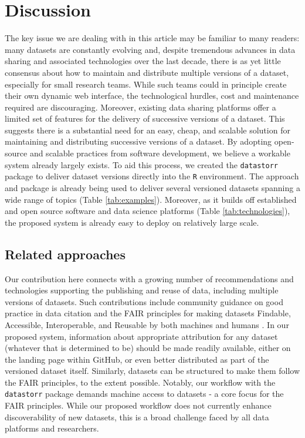 \documentclass[a4paper,num-refs]{assets/oup-contemporary}
\begin{document}
\section{Discussion}

The key issue we are dealing with in this article may be familiar to many readers: many datasets are constantly evolving and, despite tremendous advances in data sharing and associated technologies over the last decade, there is as yet little consensus about how to maintain and distribute multiple versions of a dataset, especially for small research teams. While such teams could in principle create their own dynamic web interface, the technological hurdles, cost and maintenance required are discouraging. Moreover, existing data sharing platforms offer a limited set of features for the delivery of successive versions of a dataset. This suggests there is a substantial need for an easy, cheap, and scalable solution for maintaining and distributing successive versions of a dataset. By adopting open-source and scalable practices from software development, we believe a workable system already largely exists. To aid this process, we created the \texttt{datastorr} package to deliver dataset versions directly into the \texttt{R} environment. The approach and package is already being used to deliver several versioned datasets spanning a wide range of topics (Table \ref{tab:examples}). Moreover, as it builds off established and open source software and data science platforms (Table \ref{tab:technologies}), the proposed system is already easy to deploy on relatively large scale.

\subsection{Related approaches}

Our contribution here connects with a growing number of recommendations and technologies supporting the publishing and reuse of data, including multiple versions of datasets. Such contributions include community guidance on good practice in data citation \cite{Force11-2014} and the FAIR principles for making datasets Findable, Accessible, Interoperable, and Reusable by both machines and humans \cite{Wilkinson-2016}. In our proposed system, information about appropriate attribution for any dataset  (whatever that is determined to be) should be made readily available, either on the landing page within GitHub, or even better distributed as part of the versioned dataset itself. Similarly, datasets can be structured to make them follow the FAIR principles, to the extent possible. Notably, our workflow with the \texttt{datastorr} package demands machine access to datasets - a core focus for the FAIR principles. While our proposed workflow does not currently enhance discoverability of new datasets, this is a broad challenge faced by all data platforms and researchers.
\end{document}
